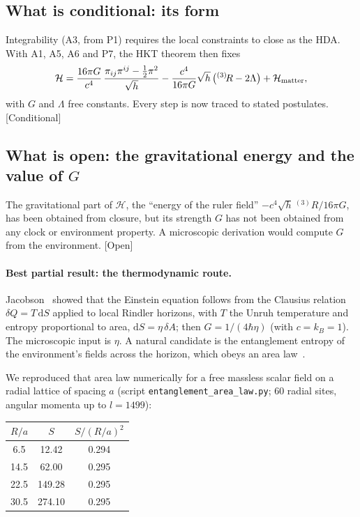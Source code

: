 \documentclass[11pt]{article}
\newcommand{\dd}{\mathrm{d}}
\newcommand{\st}[1]{\textsf{\small[#1]}}
\theoremstyle{plain}
\theoremstyle{definition}
\theoremstyle{remark}
\begin{document}
\subsection{What is conditional: its form}
Integrability (A3, from P1) requires the local constraints to close as the HDA. With A1, A5, A6 and P7, the HKT theorem then fixes
\begin{equation}
\mathcal H=\frac{16\pi G}{c^4}\,\frac{\pi_{ij}\pi^{ij}-\tfrac12\pi^2}{\sqrt h}-\frac{c^4}{16\pi G}\sqrt h\,\big({}^{(3)}\!R-2\Lambda\big)+\mathcal H_{\rm matter},
\end{equation}
with $G$ and $\Lambda$ free constants. Every step is now traced to stated postulates. \st{Conditional}

\subsection{What is open: the gravitational energy and the value of \texorpdfstring{$G$}{G}}

The gravitational part of $\mathcal H$, the ``energy of the ruler field'' $-c^4\sqrt h\,{}^{(3)}\!R/16\pi G$, has been obtained from closure, but its strength $G$ has not been obtained from any clock or environment property. A microscopic derivation would compute $G$ from the environment. \st{Open}

\paragraph{Best partial result: the thermodynamic route.}
Jacobson~\cite{Jacobson1995} showed that the Einstein equation follows from the Clausius relation $\delta Q=T\,\dd S$ applied to local Rindler horizons, with $T$ the Unruh temperature and entropy proportional to area, $\dd S=\eta\,\delta A$; then $G=1/(4\hbar\eta)$ (with $c=k_B=1$). The microscopic input is $\eta$. A natural candidate is the entanglement entropy of the environment's fields across the horizon, which obeys an area law~\cite{Bombelli1986,Srednicki1993}.

We reproduced that area law numerically for a free massless scalar field on a radial lattice of spacing $a$ (script \texttt{entanglement\_area\_law.py}; 60 radial sites, angular momenta up to $l=1499$):

\begin{center}
\begin{tabular}{@{}ccc@{}}
\toprule
$R/a$ & $S$ & $S/(R/a)^2$ \\
\midrule
6.5 & 12.42 & 0.294 \\
14.5 & 62.00 & 0.295 \\
22.5 & 149.28 & 0.295 \\
30.5 & 274.10 & 0.295 \\
\bottomrule
\end{tabular}
\end{center}
\end{document}
